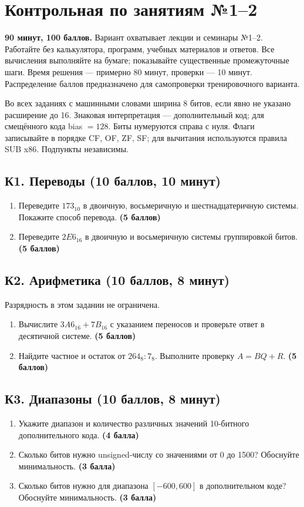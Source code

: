 \chapter{Контрольная по занятиям №1--2}\label{mock:start}
\textbf{90 минут, 100 баллов.} Вариант охватывает лекции и семинары №1--2. Работайте без калькулятора, программ, учебных материалов и ответов. Все вычисления выполняйте на бумаге; показывайте существенные промежуточные шаги. Время решения --- примерно 80 минут, проверки --- 10 минут. Распределение баллов предназначено для самопроверки тренировочного варианта.

Во всех заданиях с машинными словами ширина 8 битов, если явно не указано расширение до 16. Знаковая интерпретация --- дополнительный код; для смещённого кода bias $=128$. Биты нумеруются справа с нуля. Флаги записывайте в порядке CF, OF, ZF, SF; для вычитания используются правила SUB x86. Подпункты независимы.

\section{К1. Переводы (10 баллов, 10 минут)}\label{task:k1}
\begin{enumerate}
    \item Переведите $173_{10}$ в двоичную, восьмеричную и шестнадцатеричную системы. Покажите способ перевода. \textbf{(5 баллов)}
    \item Переведите $2E6_{16}$ в двоичную и восьмеричную системы группировкой битов. \textbf{(5 баллов)}
\end{enumerate}

\section{К2. Арифметика (10 баллов, 8 минут)}\label{task:k2}
Разрядность в этом задании не ограничена.
\begin{enumerate}
    \item Вычислите $3A6_{16}+7B_{16}$ с указанием переносов и проверьте ответ в десятичной системе. \textbf{(5 баллов)}
    \item Найдите частное и остаток от $264_8:7_8$. Выполните проверку $A=BQ+R$. \textbf{(5 баллов)}
\end{enumerate}

\section{К3. Диапазоны (10 баллов, 8 минут)}\label{task:k3}
\begin{enumerate}
    \item Укажите диапазон и количество различных значений 10-битного дополнительного кода. \textbf{(4 балла)}
    \item Сколько битов нужно unsigned-числу со значениями от 0 до 1500? Обоснуйте минимальность. \textbf{(3 балла)}
    \item Сколько битов нужно для диапазона $[-600,600]$ в дополнительном коде? Обоснуйте минимальность. \textbf{(3 балла)}
\end{enumerate}

